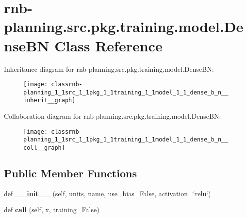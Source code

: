 \hypertarget{classrnb-planning_1_1src_1_1pkg_1_1training_1_1model_1_1_dense_b_n}{}\section{rnb-\/planning.src.\+pkg.\+training.\+model.\+Dense\+BN Class Reference}
\label{classrnb-planning_1_1src_1_1pkg_1_1training_1_1model_1_1_dense_b_n}


Inheritance diagram for rnb-\/planning.src.\+pkg.\+training.\+model.\+Dense\+BN\+:
\nopagebreak
\begin{figure}[H]
\begin{center}
\leavevmode
\texttt{[image: classrnb-planning\_1\_1src\_1\_1pkg\_1\_1training\_1\_1model\_1\_1\_dense\_b\_n\_\_inherit\_\_graph]}
\end{center}
\end{figure}


Collaboration diagram for rnb-\/planning.src.\+pkg.\+training.\+model.\+Dense\+BN\+:
\nopagebreak
\begin{figure}[H]
\begin{center}
\leavevmode
\texttt{[image: classrnb-planning\_1\_1src\_1\_1pkg\_1\_1training\_1\_1model\_1\_1\_dense\_b\_n\_\_coll\_\_graph]}
\end{center}
\end{figure}
\subsection*{Public Member Functions}
\begin{DoxyCompactItemize}
\item 
\mbox{\label{classrnb-planning_1_1src_1_1pkg_1_1training_1_1model_1_1_dense_b_n_a1126b65003e3fb4a325d175524a80f27}} 
def {\bfseries \+\_\+\+\_\+init\+\_\+\+\_\+} (self, units, name, use\+\_\+bias=False, activation=\char`\"{}relu\char`\"{})
\item 
\mbox{\label{classrnb-planning_1_1src_1_1pkg_1_1training_1_1model_1_1_dense_b_n_a58f2878b39b10bfd95df208f059f8b6a}} 
def {\bfseries call} (self, x, training=False)
\end{DoxyCompactItemize}
